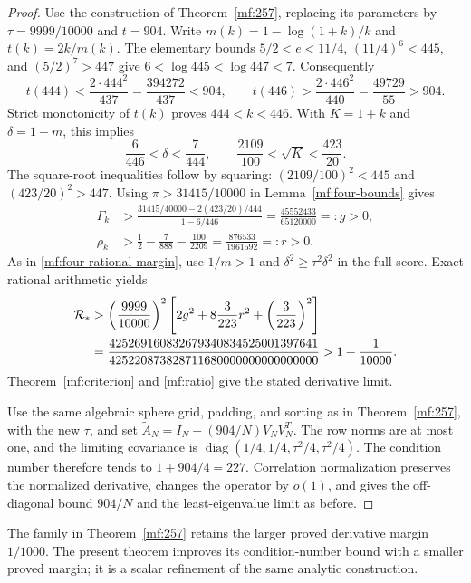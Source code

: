 \begin{proof}
Use the construction of Theorem~\ref{mf:257}, replacing its parameters
by \(\tau=9999/10000\) and \(t=904\). Write
\(m(k)=1-\log(1+k)/k\) and \(t(k)=2k/m(k)\).
The elementary bounds \(5/2<e<11/4\),
\((11/4)^6<445\), and \((5/2)^7>447\) give
\(6<\log445<\log447<7\). Consequently
\[
 t(444)<\frac{2\cdot444^2}{437}
       =\frac{394272}{437}<904,
 \qquad
 t(446)>\frac{2\cdot446^2}{440}
       =\frac{49729}{55}>904.
\]
Strict monotonicity of \(t(k)\) proves \(444<k<446\).
With \(K=1+k\) and \(\delta=1-m\), this implies
\[
 \frac6{446}<\delta<\frac7{444},\qquad
 \frac{2109}{100}<\sqrt K<\frac{423}{20}.
\]
The square-root inequalities follow by squaring:
\((2109/100)^2<445\) and \((423/20)^2>447\).
Using \(\pi>31415/10000\) in Lemma~\ref{mf:four-bounds} gives
\begin{align*}
 \Gamma_k
 &>\frac{31415/40000-2(423/20)/444}{1-6/446}
   =\frac{45552433}{65120000}=:g>0,\\
 \rho_k
 &>\frac12-\frac7{888}-\frac{100}{2209}
   =\frac{876533}{1961592}=:r>0.
\end{align*}
As in \eqref{mf:four-rational-margin}, use \(1/m>1\) and
\(\delta^2\ge\tau^2\delta^2\) in the full score. Exact rational
arithmetic yields
\begin{align}
 \mathcal R_*
 &>\left(\frac{9999}{10000}\right)^2
  \left[2g^2+8\frac3{223}r^2+
                     \left(\frac3{223}\right)^2\right]\notag\\
 &=\frac{425269160832679340834525001397641}
         {425220873828711680000000000000000}
 >1+\frac1{10000}.\label{rf:rational-margin}
\end{align}
Theorem~\ref{mf:criterion} and \eqref{mf:ratio} give the stated
derivative limit.

Use the same algebraic sphere grid, padding, and sorting as in
Theorem~\ref{mf:257}, with the new \(\tau\), and set
\(\widetilde A_N=I_N+(904/N)V_NV_N^T\). The row norms are at most
one, and the limiting covariance is
\(\operatorname{diag}(1/4,1/4,\tau^2/4,\tau^2/4)\).
The condition number therefore tends to \(1+904/4=227\).
Correlation normalization preserves the normalized derivative, changes
the operator by \(o(1)\), and gives the off-diagonal bound \(904/N\)
and the least-eigenvalue limit as before.
\end{proof}

The family in Theorem~\ref{mf:257} retains the larger proved derivative
margin \(1/1000\). The present theorem improves its condition-number
bound with a smaller proved margin; it is a scalar refinement of the
same analytic construction.
